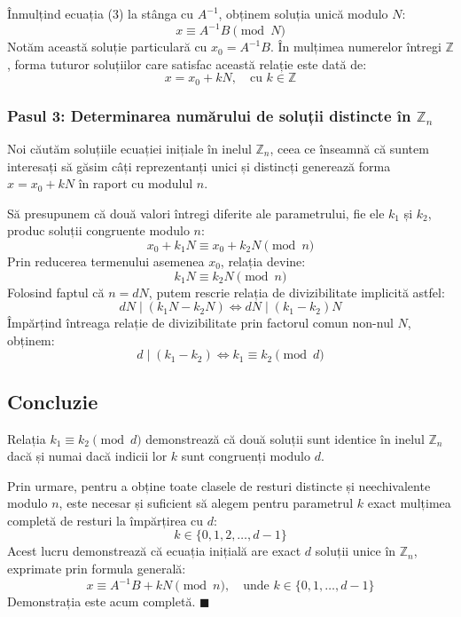 \documentclass[12pt]{article}
\begin{document}
Înmulțind ecuația (3) la stânga cu $A^{-1}$, obținem soluția unică modulo $N$:
\[
x \equiv A^{-1}B \pmod N
\]
Notăm această soluție particulară cu $x_0 = A^{-1}B$. În mulțimea numerelor întregi $\mathbb{Z}$, forma tuturor soluțiilor care satisfac această relație este dată de:
\[
x = x_0 + k N, \quad \text{cu } k \in \mathbb{Z}
\]

\subsubsection*{Pasul 3: Determinarea numărului de soluții distincte în $\mathbb{Z}_n$}
Noi căutăm soluțiile ecuației inițiale în inelul $\mathbb{Z}_n$, ceea ce înseamnă că suntem interesați să găsim câți reprezentanți unici și distincți generează forma $x = x_0 + k N$ în raport cu modulul $n$.

Să presupunem că două valori întregi diferite ale parametrului, fie ele $k_1$ și $k_2$, produc soluții congruente modulo $n$:
\[
x_0 + k_1 N \equiv x_0 + k_2 N \pmod n
\]
Prin reducerea termenului asemenea $x_0$, relația devine:
\[
k_1 N \equiv k_2 N \pmod n
\]
Folosind faptul că $n = dN$, putem rescrie relația de divizibilitate implicită astfel:
\[
dN \mid (k_1 N - k_2 N) \iff dN \mid (k_1 - k_2)N
\]
Împărțind întreaga relație de divizibilitate prin factorul comun non-nul $N$, obținem:
\[
d \mid (k_1 - k_2) \iff k_1 \equiv k_2 \pmod d
\]

\subsection*{Concluzie}
Relația $k_1 \equiv k_2 \pmod d$ demonstrează că două soluții sunt identice în inelul $\mathbb{Z}_n$ dacă și numai dacă indicii lor $k$ sunt congruenți modulo $d$. 

Prin urmare, pentru a obține toate clasele de resturi distincte și neechivalente modulo $n$, este necesar și suficient să alegem pentru parametrul $k$ exact mulțimea completă de resturi la împărțirea cu $d$:
\[
k \in \{0, 1, 2, \dots, d-1\}
\]
Acest lucru demonstrează că ecuația inițială are exact $d$ soluții unice în $\mathbb{Z}_n$, exprimate prin formula generală:
\[
x \equiv A^{-1}B + k N \pmod n, \quad \text{unde } k \in \{0, 1, \dots, d-1\}
\]
Demonstrația este acum completă. \hfill $\blacksquare$
\end{document}
